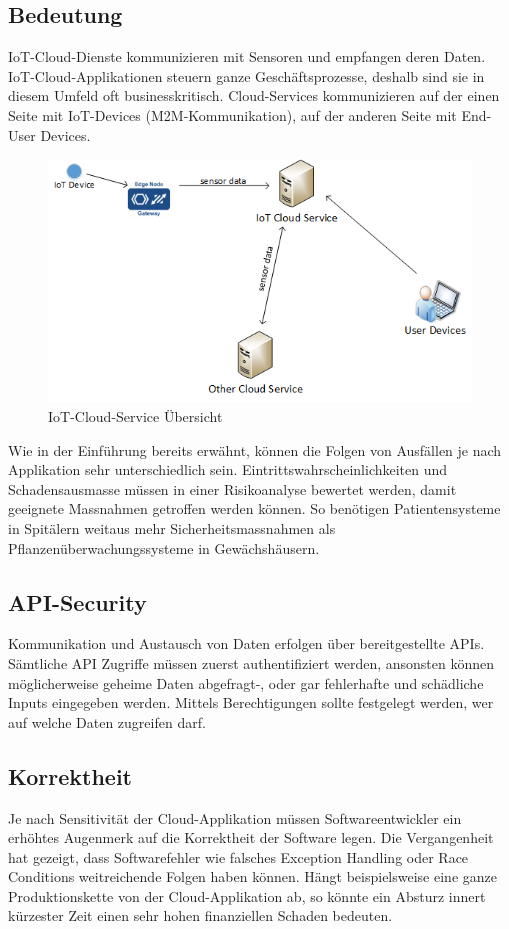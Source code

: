 \subsection{Bedeutung}
IoT-Cloud-Dienste kommunizieren mit Sensoren und empfangen deren Daten. IoT-Cloud-Applikationen steuern ganze Geschäftsprozesse, deshalb sind sie in diesem Umfeld oft businesskritisch. Cloud-Services kommunizieren auf der einen Seite mit IoT-Devices (M2M-Kommunikation), auf der anderen Seite mit End-User Devices.  
\begin{figure}[H]
\centering
\includegraphics[scale=0.8]{../02_Analyse/images/cloudservices.png}
\caption{IoT-Cloud-Service Übersicht}
\end{figure}

Wie in der Einführung bereits erwähnt, können die Folgen von Ausfällen je nach Applikation sehr unterschiedlich sein. Eintrittswahrscheinlichkeiten und Schadensausmasse müssen in einer Risikoanalyse bewertet werden, damit geeignete Massnahmen getroffen werden können. So benötigen Patientensysteme in Spitälern weitaus mehr Sicherheitsmassnahmen als Pflanzenüberwachungssysteme in Gewächshäusern.

\subsection{API-Security}
Kommunikation und Austausch von Daten erfolgen über bereitgestellte APIs. Sämtliche API Zugriffe müssen zuerst authentifiziert werden, ansonsten können möglicherweise geheime Daten abgefragt-, oder gar fehlerhafte und schädliche Inputs eingegeben werden. Mittels Berechtigungen sollte festgelegt werden, wer auf welche Daten zugreifen darf. 
\newpage
\subsection{Korrektheit}
Je nach Sensitivität der Cloud-Applikation müssen Softwareentwickler ein erhöhtes Augenmerk auf die Korrektheit der Software legen. Die Vergangenheit hat gezeigt, dass Softwarefehler wie falsches Exception Handling oder Race Conditions weitreichende Folgen haben können. Hängt beispielsweise eine ganze Produktionskette von der Cloud-Applikation ab, so könnte ein Absturz innert kürzester Zeit einen sehr hohen finanziellen Schaden bedeuten. 

